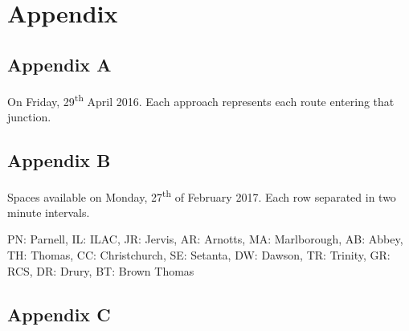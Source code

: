 \chapter*{Appendix}

\section*{Appendix A}
On Friday, 29\textsuperscript{th} April 2016. Each approach represents each route entering that junction.
\begin{center}
\end{center}


\pagebreak

\section*{Appendix B}
Spaces available on Monday, 27\textsuperscript{th} of February 2017. Each row separated in two minute intervals.
\begin{center}
\end{center}
PN: Parnell, IL: ILAC, JR: Jervis, AR: Arnotts, MA: Marlborough, AB: Abbey, TH: Thomas, CC: Christchurch, SE: Setanta, DW: Dawson, TR: Trinity, GR: RCS, DR: Drury, BT: Brown Thomas

\pagebreak

\section*{Appendix C}
\begin{center}
\end{center}